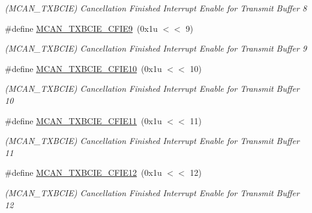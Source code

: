 \begin{DoxyCompactItemize}
\begin{DoxyCompactList}\small\item\em (M\+C\+A\+N\+\_\+\+T\+X\+B\+C\+IE) Cancellation Finished Interrupt Enable for Transmit Buffer 8 \end{DoxyCompactList}\item 
\mbox{\label{group__SAME70__MCAN_gad43b05a5d7c2ce76523b1be2468d2294}} 
\#define \mbox{\hyperlink{group__SAME70__MCAN_gad43b05a5d7c2ce76523b1be2468d2294}{M\+C\+A\+N\+\_\+\+T\+X\+B\+C\+I\+E\+\_\+\+C\+F\+I\+E9}}~(0x1u $<$$<$ 9)
\begin{DoxyCompactList}\small\item\em (M\+C\+A\+N\+\_\+\+T\+X\+B\+C\+IE) Cancellation Finished Interrupt Enable for Transmit Buffer 9 \end{DoxyCompactList}\item 
\mbox{\label{group__SAME70__MCAN_gab246f0983fa0dc6c301d4182f3659c23}} 
\#define \mbox{\hyperlink{group__SAME70__MCAN_gab246f0983fa0dc6c301d4182f3659c23}{M\+C\+A\+N\+\_\+\+T\+X\+B\+C\+I\+E\+\_\+\+C\+F\+I\+E10}}~(0x1u $<$$<$ 10)
\begin{DoxyCompactList}\small\item\em (M\+C\+A\+N\+\_\+\+T\+X\+B\+C\+IE) Cancellation Finished Interrupt Enable for Transmit Buffer 10 \end{DoxyCompactList}\item 
\mbox{\label{group__SAME70__MCAN_gaeef7100b8340f4305fef9035e8fe4389}} 
\#define \mbox{\hyperlink{group__SAME70__MCAN_gaeef7100b8340f4305fef9035e8fe4389}{M\+C\+A\+N\+\_\+\+T\+X\+B\+C\+I\+E\+\_\+\+C\+F\+I\+E11}}~(0x1u $<$$<$ 11)
\begin{DoxyCompactList}\small\item\em (M\+C\+A\+N\+\_\+\+T\+X\+B\+C\+IE) Cancellation Finished Interrupt Enable for Transmit Buffer 11 \end{DoxyCompactList}\item 
\mbox{\label{group__SAME70__MCAN_gadd6ad3df5f2b88280ccc7fdfe798c820}} 
\#define \mbox{\hyperlink{group__SAME70__MCAN_gadd6ad3df5f2b88280ccc7fdfe798c820}{M\+C\+A\+N\+\_\+\+T\+X\+B\+C\+I\+E\+\_\+\+C\+F\+I\+E12}}~(0x1u $<$$<$ 12)
\begin{DoxyCompactList}\small\item\em (M\+C\+A\+N\+\_\+\+T\+X\+B\+C\+IE) Cancellation Finished Interrupt Enable for Transmit Buffer 12 \end{DoxyCompactList}\item 

\end{DoxyCompactItemize}
